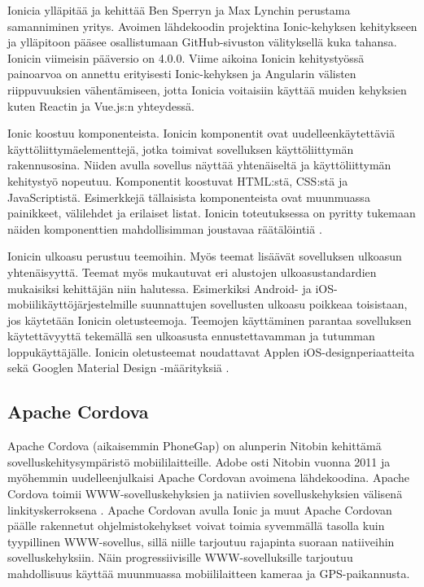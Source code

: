 \documentclass[utf8]{gradu3}
\begin{document}
Ionicia ylläpitää ja kehittää Ben Sperryn ja Max Lynchin perustama samanniminen yritys. Avoimen lähdekoodin projektina Ionic-kehyksen kehitykseen ja ylläpitoon pääsee osallistumaan GitHub-sivuston välityksellä kuka tahansa. Ionicin viimeisin pääversio on 4.0.0. Viime aikoina Ionicin kehitystyössä painoarvoa on annettu erityisesti Ionic-kehyksen ja Angularin välisten riippuvuuksien vähentämiseen, jotta Ionicia voitaisiin käyttää muiden kehyksien kuten Reactin ja Vue.js:n yhteydessä.

Ionic koostuu komponenteista. Ionicin komponentit ovat uudelleenkäytettäviä käyttöliittymäelementtejä, jotka toimivat sovelluksen käyttöliittymän rakennusosina. Niiden avulla sovellus näyttää yhtenäiseltä ja käyttöliittymän kehitystyö nopeutuu. Komponentit koostuvat HTML:stä, CSS:stä ja JavaScriptistä. Esimerkkejä tällaisista komponenteista ovat muunmuassa painikkeet, välilehdet ja erilaiset listat. Ionicin toteutuksessa on pyritty tukemaan näiden komponenttien mahdollisimman joustavaa räätälöintiä \parencite[]{ionic-documentation}.

Ionicin ulkoasu perustuu teemoihin. Myös teemat lisäävät sovelluksen ulkoasun yhtenäisyyttä. Teemat myös mukautuvat eri alustojen ulkoasustandardien mukaisiksi kehittäjän niin halutessa. Esimerkiksi Android- ja iOS-mobiilikäyttöjärjestelmille suunnattujen sovellusten ulkoasu poikkeaa toisistaan, jos käytetään Ionicin oletusteemoja. Teemojen käyttäminen parantaa sovelluksen käytettävyyttä tekemällä sen ulkoasusta ennustettavamman ja tutumman loppukäyttäjälle. Ionicin oletusteemat noudattavat Applen iOS-designperiaatteita \parencite[]{ios-design-guide} sekä Googlen Material Design -määrityksiä \parencite[]{google-material-design}.

\subsection{Apache Cordova}

Apache Cordova (aikaisemmin PhoneGap) on alunperin Nitobin kehittämä sovelluskehitysympäristö mobiililaitteille. Adobe osti Nitobin vuonna 2011 ja myöhemmin uudelleenjulkaisi Apache Cordovan avoimena lähdekoodina. Apache Cordova toimii WWW-sovelluskehyksien ja natiivien sovelluskehyksien välisenä linkityskerroksena \parencite[]{ionic-framework-hybrid}. Apache Cordovan avulla Ionic ja muut Apache Cordovan päälle rakennetut ohjelmistokehykset voivat toimia syvemmällä tasolla kuin tyypillinen WWW-sovellus, sillä niille tarjoutuu rajapinta suoraan natiiveihin sovelluskehyksiin. Näin progressiivisille WWW-sovelluksille tarjoutuu mahdollisuus käyttää muunmuassa mobiililaitteen kameraa ja GPS-paikannusta.
\end{document}
